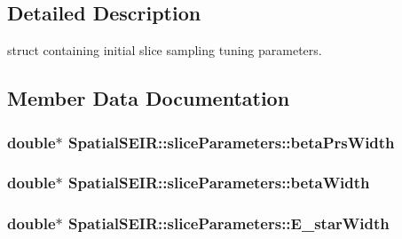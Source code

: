 \subsection{Detailed Description}
struct containing initial slice sampling tuning parameters. 

\subsection{Member Data Documentation}
\hypertarget{structSpatialSEIR_1_1sliceParameters_a1e503332bf376006b6e46c4f5eb2c1ab}{
\subsubsection[{beta\-Prs\-Width}]{\setlength{\rightskip}{0pt plus 5cm}double$\ast$ Spatial\-S\-E\-I\-R\-::slice\-Parameters\-::beta\-Prs\-Width}}\label{structSpatialSEIR_1_1sliceParameters_a1e503332bf376006b6e46c4f5eb2c1ab}
\hypertarget{structSpatialSEIR_1_1sliceParameters_a890369737115cf27a7f5f86fca564248}{
\subsubsection[{beta\-Width}]{\setlength{\rightskip}{0pt plus 5cm}double$\ast$ Spatial\-S\-E\-I\-R\-::slice\-Parameters\-::beta\-Width}}\label{structSpatialSEIR_1_1sliceParameters_a890369737115cf27a7f5f86fca564248}
\hypertarget{structSpatialSEIR_1_1sliceParameters_af81f880dad34e409ec23d3dee95cde9d}{
\subsubsection[{E\-\_\-star\-Width}]{\setlength{\rightskip}{0pt plus 5cm}double$\ast$ Spatial\-S\-E\-I\-R\-::slice\-Parameters\-::\-E\-\_\-star\-Width}}\label{structSpatialSEIR_1_1sliceParameters_af81f880dad34e409ec23d3dee95cde9d}
